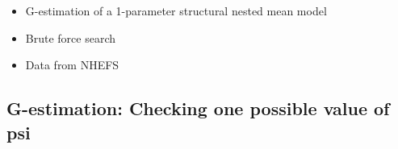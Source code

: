 \documentclass[
  10pt,
  a4paper,
]{book}
\newenvironment{Shaded}{\begin{snugshade}}{\end{snugshade}}
\newcommand{\CommentTok}[1]{\textcolor[rgb]{0.37,0.37,0.37}{#1}}
\newcommand{\FloatTok}[1]{\textcolor[rgb]{0.68,0.00,0.00}{#1}}
\newcommand{\FunctionTok}[1]{\textcolor[rgb]{0.28,0.35,0.67}{#1}}
\newcommand{\NormalTok}[1]{\textcolor[rgb]{0.00,0.46,0.62}{#1}}
\newcommand{\OtherTok}[1]{\textcolor[rgb]{0.00,0.46,0.62}{#1}}
\newcommand{\SpecialCharTok}[1]{\textcolor[rgb]{0.37,0.37,0.37}{#1}}
\newcommand{\StringTok}[1]{\textcolor[rgb]{0.13,0.47,0.30}{#1}}
\providecommand{\tightlist}{%
  \setlength{\itemsep}{0pt}\setlength{\parskip}{0pt}}
\begin{document}
\begin{itemize}
\tightlist
\item
  G-estimation of a 1-parameter structural nested mean model
\item
  Brute force search
\item
  Data from NHEFS
\end{itemize}

\subsection{G-estimation: Checking one possible value of psi}\label{g-estimation-checking-one-possible-value-of-psi}

\begin{Shaded}
\end{Shaded}
\end{document}
